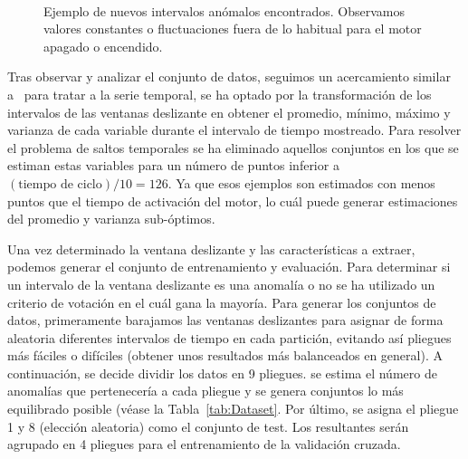 \documentclass[12pt,letterpaper]{article}
\begin{document}
\begin{figure}[!ht]
        \centering
        \\
        \caption{Ejemplo de nuevos intervalos anómalos encontrados. Observamos valores constantes o fluctuaciones fuera de lo habitual para el motor apagado o encendido.}
        \label{fig:EventosRaros}
\end{figure}

Tras observar y analizar el conjunto de datos, seguimos un acercamiento similar a~\cite{PredictiveMaintenance,FailureDetection} para tratar a la serie temporal, 
se ha optado por la transformación de los intervalos de las ventanas deslizante en obtener el promedio, mínimo, máximo y varianza de cada variable durante el intervalo de tiempo mostreado. 
Para resolver el problema de saltos temporales se ha eliminado aquellos conjuntos en los que se estiman estas variables para un número de puntos inferior a $(\textrm{tiempo de ciclo}) / 10 = 126$. Ya que esos ejemplos 
son estimados con menos puntos que el tiempo de activación del motor, lo cuál puede generar estimaciones del promedio y varianza sub-óptimos.

Una vez determinado la ventana deslizante y las características a extraer, podemos generar el conjunto de entrenamiento y evaluación. 
Para determinar si un intervalo de la ventana deslizante es una anomalía o no se ha utilizado un criterio de votación en el cuál gana la mayoría.
Para generar los conjuntos de datos, primeramente barajamos las ventanas deslizantes para asignar de forma aleatoria diferentes intervalos de tiempo en cada partición, 
evitando así pliegues más fáciles o difíciles (obtener unos resultados más balanceados en general). A continuación, se decide dividir los datos en 9 pliegues. 
se estima el número de anomalías que pertenecería a cada pliegue y se genera conjuntos lo más equilibrado posible (véase la Tabla~\ref{tab:Dataset}. 
Por último, se asigna el pliegue 1 y 8 (elección aleatoria) como el conjunto de test. Los resultantes serán agrupado en 4 pliegues para el entrenamiento de la validación cruzada. 
\end{document}
